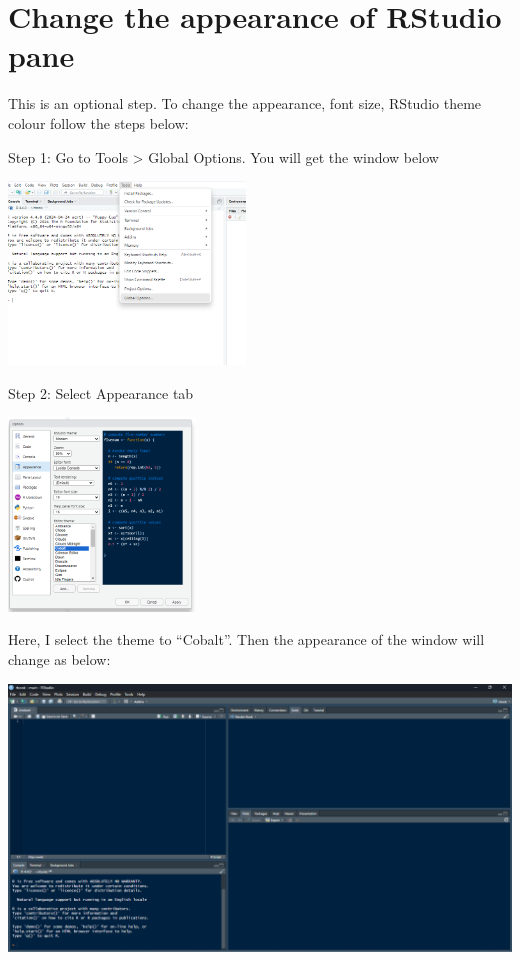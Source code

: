 \documentclass[
  letterpaper,
  DIV=11,
  numbers=noendperiod]{scrreprt}
\begin{document}
\hypertarget{change-the-appearance-of-rstudio-pane}{%
\section{Change the appearance of RStudio
pane}\label{change-the-appearance-of-rstudio-pane}}

This is an optional step. To change the appearance, font size, RStudio
theme colour follow the steps below:

Step 1: Go to Tools \textgreater{} Global Options. You will get the
window below

\includegraphics[width=2.48in,height=\textheight]{img/chap1/rw6.png}

Step 2: Select Appearance tab

\includegraphics[width=1.96in,height=\textheight]{img/chap1/rw7.png}

Here, I select the theme to ``Cobalt''. Then the appearance of the
window will change as below:

\includegraphics[width=5.33in,height=\textheight]{img/chap1/rw12.png}
\end{document}
